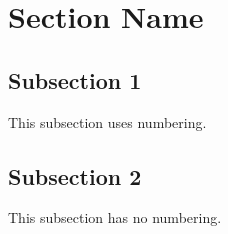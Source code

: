 
\section{Section Name}
\subsection{Subsection 1}
This subsection uses numbering.

\subsection*{Subsection 2}
This subsection has no numbering.